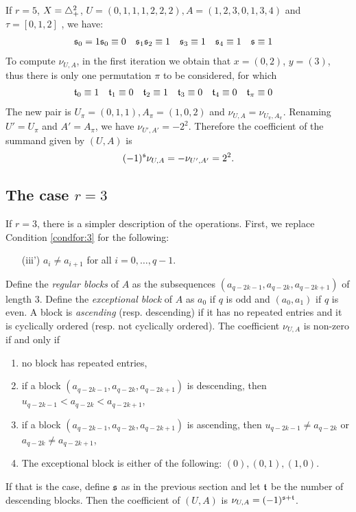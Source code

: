 \begin{example}
	If $r=5$, $X= \triangle_{+}^2$, $U = (0,1,1,1,2,2,2), A = (1,2,3,0,1,3,4)$ and $\tau = [0,1,2]$ , we have:
	\begin{align*}
	\signo_0 = 1
  \signo_0 &\equiv 0
		&
		\signo_1 %
		&
		\signo_2 \equiv 1
		&
		\signo_3 &\equiv 1
		&
		\signo_4 &\equiv 1
		&
		\signo &\equiv 1
	\end{align*}
	To compute $\nu_{U,A}$, in the first iteration we obtain that $x=(0,2)$, $y=(3)$, thus there is only one permutation $\pi$ to be considered, for which
	\begin{align*}
		\mathfrak{t}_0 &\equiv 1
		&
		\mathfrak{t}_1 &\equiv 0
		&
		\mathfrak{t}_2 &\equiv 1
		&
		\mathfrak{t}_3 &\equiv 0
		&
		\mathfrak{t}_4 &\equiv 0
		&
		\mathfrak{t}_{\pi} &\equiv 0
	\end{align*}
	The new pair is $U_{\pi} = (0,1,1), A_\pi = (1,0,2)$ and $\nu_{U,A} = \nu_{U_\pi,A_\pi}$. Renaming $U' = U_\pi$ and $A' = A_\pi$, we have $\nu_{U',A'} = -2^2$. Therefore the coefficient of the summand given by $(U,A)$ is
	\[
		(-1)^{\mathfrak{s}} \nu_{U,A} = -\nu_{U',A'} = 2^2.
	\]
\end{example}

\subsection{The case \texorpdfstring{$r=3$}{r = 3}} If $r=3$, there is a simpler description of the operations. First, we replace Condition \eqref{condfor:3} for the following:
\begin{itemize}
	\item[(iii')] $a_i\neq a_{i+1}$ for all $i=0,\ldots,q-1$.
\end{itemize}
Define the \emph{regular blocks} of $A$ as the subsequences $(a_{q-2k-1},a_{q-2k},a_{q-2k+1})$ of length $3$. Define the \emph{exceptional block} of $A$ as $a_0$ if $q$ is odd and $(a_0,a_1)$ if $q$ is even. A block is \emph{ascending} (resp. descending) if it has no repeated entries and it is cyclically ordered (resp. not cyclically ordered). The coefficient $\nu_{U,A}$ is non-zero if and only if
\begin{enumerate}
	\item no block has repeated entries,
	\item if a block $(a_{q-2k-1},a_{q-2k},a_{q-2k+1})$ is descending, then $u_{q-2k-1}<a_{q-2k}<a_{q-2k+1}$,
	\item if a block $(a_{q-2k-1},a_{q-2k},a_{q-2k+1})$ is ascending, then $u_{q-2k-1}\neq a_{q-2k}$ or $a_{q-2k}\neq a_{q-2k+1}$,
	\item The exceptional block is either of the following: $(0),(0,1),(1,0)$.
\end{enumerate}
If that is the case, define $\mathfrak{s}$ as in the previous section and let $\mathfrak{t}$ be the number of descending blocks. Then the coefficient of $(U,A)$ is $\nu_{U,A} = (-1)^{\mathfrak{s}+\mathfrak{t}}$.

